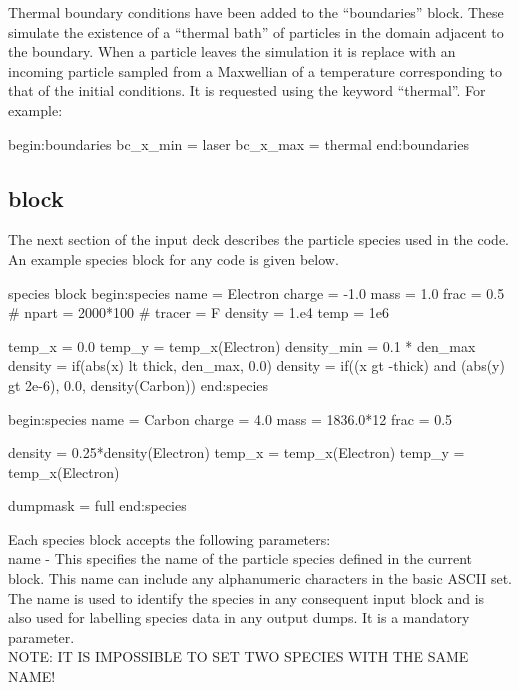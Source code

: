 Thermal boundary conditions have been added to the ``boundaries'' block.
These simulate the existence of a ``thermal bath'' of particles in the
domain adjacent to the boundary. When a particle leaves the simulation it is
replace with an incoming particle sampled from a Maxwellian of a temperature
corresponding to that of the initial conditions. It is requested using the
keyword ``thermal''.
For example:

\begin{boxverbatim}
begin:boundaries
   bc_x_min = laser
   bc_x_max = thermal
end:boundaries
\end{boxverbatim}


\subsection{ block}
\label{sec:species_block}
The next section of the input deck describes the particle species used in the
code. An example species block for any {\EPOCH} code is given below.
\begin{lboxverbatim}{species block}
begin:species
   name = Electron
   charge = -1.0
   mass = 1.0
   frac = 0.5
   # npart = 2000*100
   # tracer = F
   density = 1.e4
   temp = 1e6

   temp_x = 0.0
   temp_y = temp_x(Electron)
   density_min = 0.1 * den_max
   density = if(abs(x) lt thick, den_max, 0.0)
   density = if((x gt -thick) and (abs(y) gt 2e-6), 0.0, density(Carbon))
end:species

begin:species
   name = Carbon
   charge = 4.0
   mass = 1836.0*12
   frac = 0.5

   density = 0.25*density(Electron)
   temp_x = temp_x(Electron)
   temp_y = temp_x(Electron)

   dumpmask = full
end:species
\end{lboxverbatim}

Each species block accepts the following parameters:\\

{\emphtext name} - This specifies the name of the particle species defined
in the current block. This name can include any alphanumeric characters in
the basic ASCII set. The name is used to identify the species in any
consequent input block and is also used for labelling species data in any
output dumps. It is a mandatory parameter.\\

{\emphtext NOTE: IT IS IMPOSSIBLE TO SET TWO SPECIES WITH THE SAME NAME!} \\

